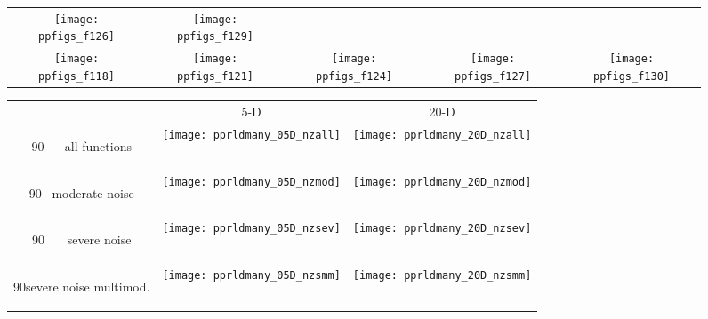 \documentclass[sigconf]{acmart}
\newcommand{\aRT}{\ensuremath{\mathrm{aRT}}}
\newcommand{\rot}[2][2.5]{
  \hspace*{-3.5\baselineskip}%
  \begin{rotate}{90}\hspace{#1em}#2
  \end{rotate}}
\begin{document}
{\begin{figure*}
\begin{tabular}{@{}c@{}c@{}c@{}c@{}c@{}}
\texttt{[image: ppfigs\_f126]}&
\texttt{[image: ppfigs\_f129]}\\
\texttt{[image: ppfigs\_f118]}&
\texttt{[image: ppfigs\_f121]}&
\texttt{[image: ppfigs\_f124]}&
\texttt{[image: ppfigs\_f127]}&
\texttt{[image: ppfigs\_f130]}
\end{tabular}
\caption[Average running time (\aRT) divided by dimension
versus dimension in log-log presentation]{\label{fig:scaling}%
}
\end{figure*}




\begin{figure*}
   \begin{tabular}{@{}c@{}c@{}c@{}}
      \,\, & 5-D & 20-D\\
			\rot{\Large\sffamily \,\,\,\,\,\,\,\,\,\,all functions}\hspace{1em} &
			   \texttt{[image: pprldmany\_05D\_nzall]} &
			   \texttt{[image: pprldmany\_20D\_nzall]}\\[1em]
			\rot{\Large\sffamily \,\,\,\,\,moderate noise}\hspace{1em} &
			   \texttt{[image: pprldmany\_05D\_nzmod]} &
			   \texttt{[image: pprldmany\_20D\_nzmod]}\\[1em]
			\rot{\Large\sffamily \,\,\,\,\,\,\,\,\,\,\,severe noise}\hspace{1em} &
			   \texttt{[image: pprldmany\_05D\_nzsev]} &
			   \texttt{[image: pprldmany\_20D\_nzsev]}\\[1em]
			\rot{\Large\sffamily \!\!severe noise multimod.}\hspace{1em} &
			   \texttt{[image: pprldmany\_05D\_nzsmm]} &
			   \texttt{[image: pprldmany\_20D\_nzsmm]}
    \end{tabular}
\caption{\label{fig:ECDFs} }
\end{figure*}


}
\end{document}
